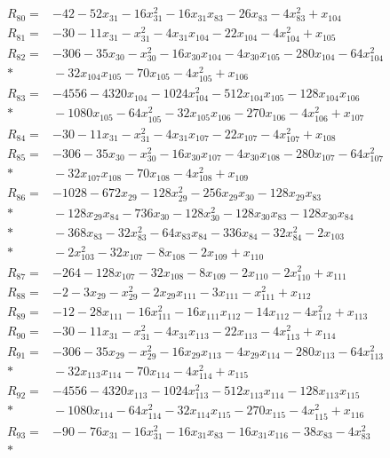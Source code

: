 \begin{align*}
R_{80}={}&-42-52x_{31}-16x_{31}^{2}-16x_{31}x_{83}-26x_{83}-4x_{83}^{2}+x_{104}\\[3pt]
R_{81}={}&-30-11x_{31}-x_{31}^{2}-4x_{31}x_{104}-22x_{104}-4x_{104}^{2}+x_{105}\\[3pt]
R_{82}={}&-306-35x_{30}-x_{30}^{2}-16x_{30}x_{104}-4x_{30}x_{105}-280x_{104}-64x_{104}^{2}\\*
&{}-32x_{104}x_{105}-70x_{105}-4x_{105}^{2}+x_{106}\\[3pt]
R_{83}={}&-4556-4320x_{104}-1024x_{104}^{2}-512x_{104}x_{105}-128x_{104}x_{106}\\*
&{}-1080x_{105}-64x_{105}^{2}-32x_{105}x_{106}-270x_{106}-4x_{106}^{2}+x_{107}\\[3pt]
R_{84}={}&-30-11x_{31}-x_{31}^{2}-4x_{31}x_{107}-22x_{107}-4x_{107}^{2}+x_{108}\\[3pt]
R_{85}={}&-306-35x_{30}-x_{30}^{2}-16x_{30}x_{107}-4x_{30}x_{108}-280x_{107}-64x_{107}^{2}\\*
&{}-32x_{107}x_{108}-70x_{108}-4x_{108}^{2}+x_{109}\\[3pt]
R_{86}={}&-1028-672x_{29}-128x_{29}^{2}-256x_{29}x_{30}-128x_{29}x_{83}\\*
&{}-128x_{29}x_{84}-736x_{30}-128x_{30}^{2}-128x_{30}x_{83}-128x_{30}x_{84}\\*
&{}-368x_{83}-32x_{83}^{2}-64x_{83}x_{84}-336x_{84}-32x_{84}^{2}-2x_{103}\\*
&{}-2x_{103}^{2}-32x_{107}-8x_{108}-2x_{109}+x_{110}\\[3pt]
R_{87}={}&-264-128x_{107}-32x_{108}-8x_{109}-2x_{110}-2x_{110}^{2}+x_{111}\\[3pt]
R_{88}={}&-2-3x_{29}-x_{29}^{2}-2x_{29}x_{111}-3x_{111}-x_{111}^{2}+x_{112}\\[3pt]
R_{89}={}&-12-28x_{111}-16x_{111}^{2}-16x_{111}x_{112}-14x_{112}-4x_{112}^{2}+x_{113}\\[3pt]
R_{90}={}&-30-11x_{31}-x_{31}^{2}-4x_{31}x_{113}-22x_{113}-4x_{113}^{2}+x_{114}\\[3pt]
R_{91}={}&-306-35x_{29}-x_{29}^{2}-16x_{29}x_{113}-4x_{29}x_{114}-280x_{113}-64x_{113}^{2}\\*
&{}-32x_{113}x_{114}-70x_{114}-4x_{114}^{2}+x_{115}\\[3pt]
R_{92}={}&-4556-4320x_{113}-1024x_{113}^{2}-512x_{113}x_{114}-128x_{113}x_{115}\\*
&{}-1080x_{114}-64x_{114}^{2}-32x_{114}x_{115}-270x_{115}-4x_{115}^{2}+x_{116}\\[3pt]
R_{93}={}&-90-76x_{31}-16x_{31}^{2}-16x_{31}x_{83}-16x_{31}x_{116}-38x_{83}-4x_{83}^{2}\\*

\end{align*}
